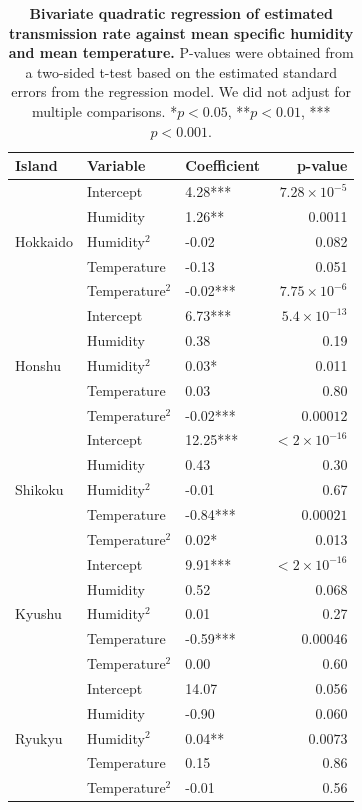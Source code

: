 \documentclass[12pt]{article}
\begin{document}
\begin{table}[ht]
\centering
\begin{tabular}{l|l|l|r}
\hline
\textbf{Island} & \textbf{Variable} & \textbf{Coefficient} & \textbf{p-value} \\
\hline
\multirow{5}{*}{Hokkaido} & Intercept & 4.28*** & $7.28\times 10^{-5}$ \\
                            & Humidity & 1.26** & 0.0011 \\
                            & Humidity$^2$ & -0.02 & 0.082 \\
                            & Temperature & -0.13 & 0.051 \\
                            & Temperature$^2$ & -0.02*** & $7.75 \times 10^{-6}$ \\
\hline
\multirow{5}{*}{Honshu} & Intercept & 6.73*** & $5.4 \times 10^{-13}$ \\
                            & Humidity & 0.38 & 0.19 \\
                            & Humidity$^2$ & 0.03* & 0.011 \\
                            & Temperature & 0.03 & 0.80 \\
                            & Temperature$^2$ & -0.02*** & $0.00012$ \\
\hline
\multirow{5}{*}{Shikoku} & Intercept & 12.25*** & $<2 \times 10^{-16}$ \\
                            & Humidity & 0.43 & 0.30 \\
                            & Humidity$^2$ & -0.01 & 0.67 \\
                            & Temperature & -0.84*** & $0.00021$ \\
                            & Temperature$^2$ & 0.02* & 0.013 \\
\hline
\multirow{5}{*}{Kyushu} & Intercept & 9.91*** & $<2 \times 10^{-16}$ \\
                            & Humidity & 0.52 & 0.068 \\
                            & Humidity$^2$ & 0.01 & 0.27 \\
                            & Temperature & -0.59*** & $0.00046$ \\
                            & Temperature$^2$ & 0.00 & 0.60 \\
\hline
\multirow{5}{*}{Ryukyu} & Intercept & 14.07 & 0.056 \\
                            & Humidity & -0.90 & 0.060 \\
                            & Humidity$^2$ & 0.04** & $0.0073$ \\
                            & Temperature & 0.15 & 0.86 \\
                            & Temperature$^2$ & -0.01 & 0.56 \\
\hline
\end{tabular}
\caption{
\textbf{Bivariate quadratic regression of estimated transmission rate against mean specific humidity and mean temperature.}
P-values were obtained from a two-sided t-test based on the estimated standard errors from the regression model.
We did not adjust for multiple comparisons.
*$p<0.05$, **$p<0.01$, ***$p<0.001$.
}
\end{table}
\end{document}
